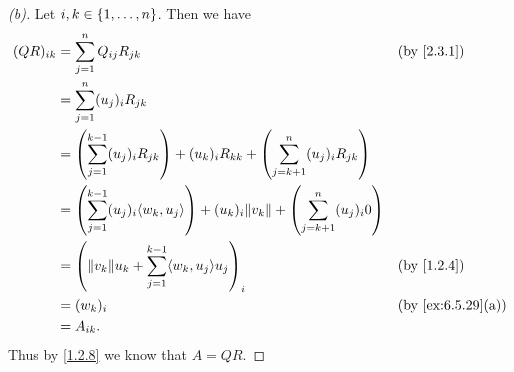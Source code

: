 \begin{proof}[(b)]
  Let \(i, k \in \left\lbrace1, \dots, n\right\rbrace\).
  Then we have
  \begin{align*}
    (QR)_{i k} & = \sum_{j = 1}^n Q_{i j} R_{j k}                                                                            &  & \by{2.3.1}        \\
               & = \sum_{j = 1}^n (u_j)_i R_{j k}                                                                                                   \\
               & = \pa{\sum_{j = 1}^{k - 1} (u_j)_i R_{j k}} + (u_k)_i R_{k k} + \pa{\sum_{j = k + 1}^n (u_j)_i R_{j k}}                            \\
               & = \pa{\sum_{j = 1}^{k - 1} (u_j)_i \inn{w_k, u_j}} + (u_k)_i \norm{v_k} + \pa{\sum_{j = k + 1}^n (u_j)_i 0}                        \\
               & = \pa{\norm{v_k} u_k + \sum_{j = 1}^{k - 1} \inn{w_k, u_j} u_j}_i                                           &  & \by{1.2.4}        \\
               & = (w_k)_i                                                                                                   &  & \by{ex:6.5.29}[a] \\
               & = A_{i k}.
  \end{align*}
  Thus by \cref{1.2.8} we know that \(A = QR\).
\end{proof}

